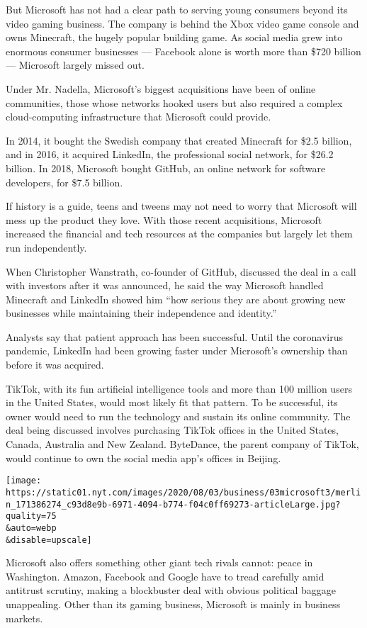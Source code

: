 But Microsoft has not had a clear path to serving young consumers beyond
its video gaming business. The company is behind the Xbox video game
console and owns Minecraft, the hugely popular building game. As social
media grew into enormous consumer businesses --- Facebook alone is worth
more than \$720 billion --- Microsoft largely missed out.

Under Mr. Nadella, Microsoft's biggest acquisitions have been of online
communities, those whose networks hooked users but also required a
complex cloud-computing infrastructure that Microsoft could provide.

In 2014, it bought the Swedish company that created Minecraft for \$2.5
billion, and in 2016, it acquired LinkedIn, the professional social
network, for \$26.2 billion. In 2018, Microsoft bought GitHub, an online
network for software developers, for \$7.5 billion.

If history is a guide, teens and tweens may not need to worry that
Microsoft will mess up the product they love. With those recent
acquisitions, Microsoft increased the financial and tech resources at
the companies but largely let them run independently.

When Christopher Wanstrath, co-founder of GitHub, discussed the deal in
a call with investors after it was announced, he said the way Microsoft
handled Minecraft and LinkedIn showed him ``how serious they are about
growing new businesses while maintaining their independence and
identity.''

Analysts say that patient approach has been successful. Until the
coronavirus pandemic, LinkedIn had been growing faster under Microsoft's
ownership than before it was acquired.

TikTok, with its fun artificial intelligence tools and more than 100
million users in the United States, would most likely fit that pattern.
To be successful, its owner would need to run the technology and sustain
its online community. The deal being discussed involves purchasing
TikTok offices in the United States, Canada, Australia and New Zealand.
ByteDance, the parent company of TikTok, would continue to own the
social media app's offices in Beijing.

\texttt{[image: https://static01.nyt.com/images/2020/08/03/business/03microsoft3/merlin\_171386274\_c93d8e9b-6971-4094-b774-f04c0ff69273-articleLarge.jpg?quality=75\\\&auto=webp\\\&disable=upscale]}

Microsoft also offers something other giant tech rivals cannot: peace in
Washington. Amazon, Facebook and Google have to tread carefully amid
antitrust scrutiny, making a blockbuster deal with obvious political
baggage unappealing. Other than its gaming business, Microsoft is mainly
in business markets.

